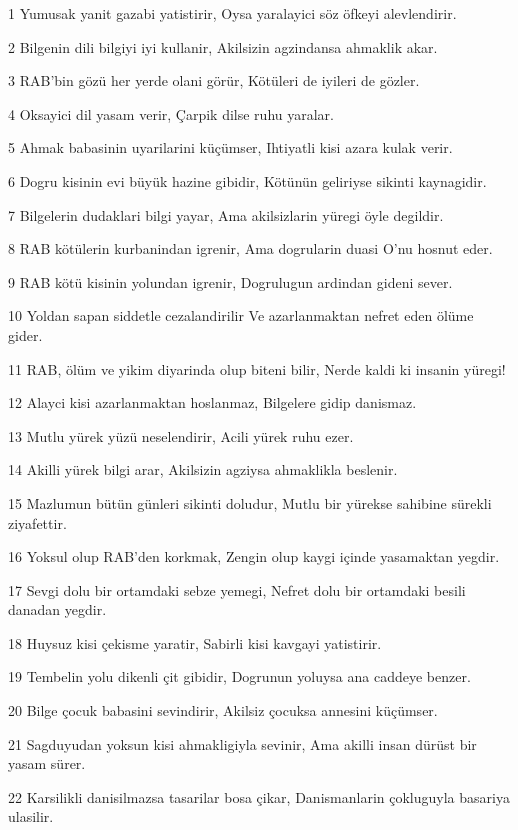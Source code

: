\par 1 Yumusak yanit gazabi yatistirir, Oysa yaralayici söz öfkeyi alevlendirir.
\par 2 Bilgenin dili bilgiyi iyi kullanir, Akilsizin agzindansa ahmaklik akar.
\par 3 RAB'bin gözü her yerde olani görür, Kötüleri de iyileri de gözler.
\par 4 Oksayici dil yasam verir, Çarpik dilse ruhu yaralar.
\par 5 Ahmak babasinin uyarilarini küçümser, Ihtiyatli kisi azara kulak verir.
\par 6 Dogru kisinin evi büyük hazine gibidir, Kötünün geliriyse sikinti kaynagidir.
\par 7 Bilgelerin dudaklari bilgi yayar, Ama akilsizlarin yüregi öyle degildir.
\par 8 RAB kötülerin kurbanindan igrenir, Ama dogrularin duasi O'nu hosnut eder.
\par 9 RAB kötü kisinin yolundan igrenir, Dogrulugun ardindan gideni sever.
\par 10 Yoldan sapan siddetle cezalandirilir Ve azarlanmaktan nefret eden ölüme gider.
\par 11 RAB, ölüm ve yikim diyarinda olup biteni bilir, Nerde kaldi ki insanin yüregi!
\par 12 Alayci kisi azarlanmaktan hoslanmaz, Bilgelere gidip danismaz.
\par 13 Mutlu yürek yüzü neselendirir, Acili yürek ruhu ezer.
\par 14 Akilli yürek bilgi arar, Akilsizin agziysa ahmaklikla beslenir.
\par 15 Mazlumun bütün günleri sikinti doludur, Mutlu bir yürekse sahibine sürekli ziyafettir.
\par 16 Yoksul olup RAB'den korkmak, Zengin olup kaygi içinde yasamaktan yegdir.
\par 17 Sevgi dolu bir ortamdaki sebze yemegi, Nefret dolu bir ortamdaki besili danadan yegdir.
\par 18 Huysuz kisi çekisme yaratir, Sabirli kisi kavgayi yatistirir.
\par 19 Tembelin yolu dikenli çit gibidir, Dogrunun yoluysa ana caddeye benzer.
\par 20 Bilge çocuk babasini sevindirir, Akilsiz çocuksa annesini küçümser.
\par 21 Sagduyudan yoksun kisi ahmakligiyla sevinir, Ama akilli insan dürüst bir yasam sürer.
\par 22 Karsilikli danisilmazsa tasarilar bosa çikar, Danismanlarin çokluguyla basariya ulasilir.
